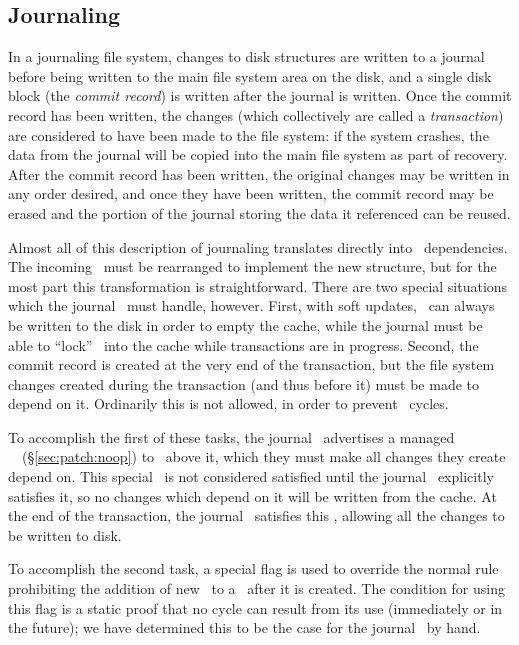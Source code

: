 \subsection{Journaling}
\label{sec:using:journal}

In a journaling file system,
changes to disk structures are written to a journal before being written to the
main file system area on the disk, and a single disk block (the \emph{commit
record}) is written after the journal is written. Once the commit record has
been written, the changes (which collectively are called a \emph{transaction})
are considered to have been made to the file system: if the system crashes, the
data from the journal will be copied into the main file system as part of
recovery. After the commit record has been written, the original changes may be
written in any order desired, and once they have been written, the commit record
may be erased and the portion of the journal storing the data it referenced can
be reused.

Almost all of this description of journaling translates directly into \chdesc\
dependencies. The incoming \chdescs\ must be rearranged to implement the new
structure, but for the most part this transformation is straightforward. There
are two special situations which the journal \module\ must handle, however.
First, with soft updates, \chdescs\ can always be written to the disk in order
to empty the cache, while the journal must be able to ``lock'' \chdescs\ into
the cache while transactions are in progress. Second, the commit record is
created at the very end of the transaction, but the file system changes created
during the transaction (and thus before it) must be made to depend on it.
Ordinarily this is not allowed, in order to prevent \chdesc\ cycles.

To accomplish the first of these tasks, the journal \module\ advertises a
managed \noop\ \chdesc\ (\S\ref{sec:patch:noop}) to \modules\ above it,
which they must make all changes they create depend on. This special \chdesc\ is
not considered satisfied until the journal \module\ explicitly satisfies it, so
no changes which depend on it will be written from the cache.  At the end of the
transaction, the journal \module\ satisfies this \chdesc, allowing all the
changes to be written to disk.

To accomplish the second task, a special flag is used to override the normal
rule prohibiting the addition of new \befores\ to a \chdesc\ after it is
created. The condition for using this flag is a static proof that no cycle can
result from its use (immediately or in the future); we have determined this to
be the case for the journal \module\ by hand.

